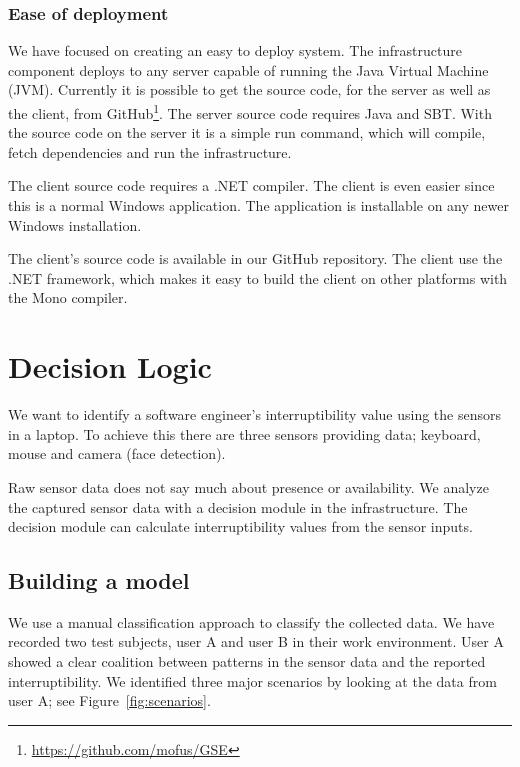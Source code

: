 \documentclass{sigchi}
\begin{document}
\subsubsection{Ease of deployment}
We have focused on creating an easy to deploy system.
The infrastructure component deploys to any server capable of running the Java Virtual Machine (JVM).
Currently it is possible to get the source code, for the server as well as the client, from GitHub\footnote{\url{https://github.com/mofus/GSE}}.
The server source code requires Java and SBT.
With the source code on the server it is a simple run command, which will compile, fetch dependencies and run the infrastructure.

The client source code requires a .NET compiler.
The client is even easier since this is a normal Windows application.
The application is installable on any newer Windows installation.

The client's source code is available in our GitHub repository.
The client use the .NET framework, which makes it easy to build the client on other platforms with the Mono compiler.


\section{Decision Logic}
\label{sec:decision_logic}
We want to identify a software engineer's interruptibility value using the sensors in a laptop.
To achieve this there are three sensors providing data; keyboard, mouse and camera (face detection).

Raw sensor data does not say much about presence or availability.
We analyze the captured sensor data with a decision module in the infrastructure.
The decision module can calculate interruptibility values from the sensor inputs.

\subsection{Building a model}
We use a manual classification approach to classify the collected data.
We have recorded two test subjects, user A and user B in their work environment.
User A showed a clear coalition between patterns in the sensor data and the reported interruptibility.
We identified three major scenarios by looking at the data from user A; see  Figure~\ref{fig:scenarios}.
\end{document}
